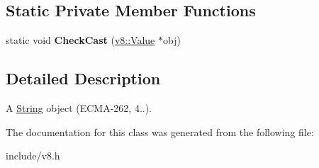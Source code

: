 \subsection*{Static Private Member Functions}
\begin{DoxyCompactItemize}
\item 
static void {\bfseries Check\+Cast} (\hyperlink{classv8_1_1_value}{v8\+::\+Value} $\ast$obj)\hypertarget{classv8_1_1_string_object_ada6a0b8ce6681cedc8946c8eb8163d63}{}\label{classv8_1_1_string_object_ada6a0b8ce6681cedc8946c8eb8163d63}

\end{DoxyCompactItemize}


\subsection{Detailed Description}
A \hyperlink{classv8_1_1_string}{String} object (E\+C\+M\+A-\/262, 4..). 

The documentation for this class was generated from the following file\+:\begin{DoxyCompactItemize}
\item 
include/v8.\+h\end{DoxyCompactItemize}
